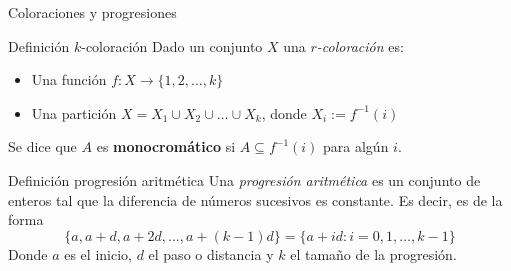 \begin{frame}{Coloraciones y progresiones}
    \begin{block}{Definición $k$-coloración}
        Dado un conjunto $X$ una \textit{$r$-coloración} es:
        \begin{itemize}
            \item [(I)] Una función $f:X\to \{1,2,\dots,k\}$
            \item[(II)] Una partición $X=X_{1}\cup X_{2}\cup\dots\cup X_{k}$, donde $X_{i}:=f^{-1}(i)$
        \end{itemize}
        Se dice que $A$ es \textbf{monocromático} si $A\subseteq f^{-1}(i)$ para algún $i$.
    \end{block}

    \begin{block}{Definición progresión aritmética}
        Una \textit{progresión aritmética} es un conjunto de enteros tal que la diferencia de números sucesivos es constante. Es decir, es de la forma
        $$\{a, a+d,a+2d,\dots,a+(k-1)d\}=\{a+id:i=0,1,\dots,k-1\}$$
        Donde $a$ es el inicio, $d$ el paso o distancia y $k$ el tamaño de la progresión.
    \end{block}
\end{frame}

